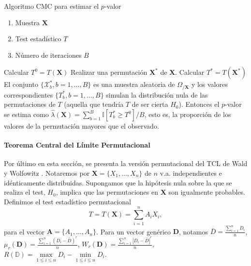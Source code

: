 \begin{algorithm}
	\caption{Algoritmo CMC para estimar el $p$-valor}
	\label{alg:CMC-pvalue}
	\begin{algorithmic}[1]
	\REQUIRE
		\begin{enumerate}[a]
		\item Muestra $\mathbf{X}$
		\item Test estadístico $T$
		\item Número de iteraciones $B$
		\end{enumerate}
		\STATE Calcular $T^0 = T(\mathbf{X})$
			\STATE Realizar una permutación $\mathbf{X}^*$ de  
			$\mathbf{X}$.
			\STATE Calcular $T^* = T(\mathbf{X}^*)$
		\ENDFOR
		\STATE El conjunto $\{ \mathcal{X}^*_b, b = 1, \dots, 
		B \}$ es una muestra aleatoria de 
		$\Omega_{/\mathbf{X}}$ y los valores correspondientes 
		$\{ T^*_b, b = 1, \dots, B \}$ simulan la 
		distribución nula de las permutaciones de $T$ 
		(aquella que tendría $T$ de ser cierta $H_0$). 
		Entonces el $p$-valor se estima como $\hat{\lambda}
		(\mathbf{X}) = \sum\limits_{b=1}^B 
		\mathbb{I}[T_b^* \geq T^0]/B$, esto es, la proporción 
		de los valores de la permutación mayores que el 
		observado.
	\end{algorithmic}
\end{algorithm}

\paragraph{Teorema Central del Límite Permutacional}
	Por último en esta sección, se presenta la versión 
permutacional del TCL de Wald y Wolfowitz \cite{WALWOL44}.
Notaremos por $\mathbf{X} = \{X_1, \dots, X_n\}$ de $n$ v.a. 
independientes e idénticamente distribuidas. Supongamos que 
la hipótesis nula sobre la que se realiza el test, $H_0$, 
implica que las permutaciones en $\mathbf{X}$ son igualmente 
probables.\\
	Definimos el test estadístico permutacional
	\[
		T = T(\mathbf{X}) = 
			\sum\limits_{i=1}^n
				A_i X_i,
	\]
	para el vector $\mathbf{A} = \{A_1, \dots, A_n\}$. Para 
un vector genérico $\mathbf{D}$, notamos $\bar{D} = 
\frac{\sum\limits_{i=1}^n D_i}{n}$, $\mu_r(\mathbf{D}) = 
\frac{\sum\limits_{i=1}^n (D_i - \bar{D})^r}{n}$, 
$W_r(\mathbf{D}) = \frac{\sum\limits_{i=1}^n 
|D_i - \bar{D}|^r}{n}$, $R(\mathbb{D}) = 
\underset{1 \leq i \leq n}{\max} D_i - 
\underset{1 \leq i \leq n}{\min} D_i$.\\

